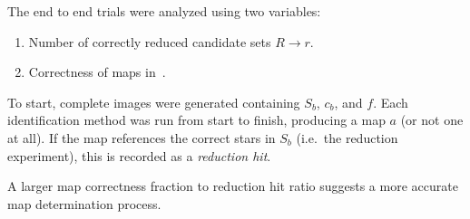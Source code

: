 The end to end trials were analyzed using two variables:
\begin{enumerate}
    \item \label{itm:correctReducedCandidates} Number of correctly reduced candidate sets $R \rightarrow r$.
    \item Correctness of maps in~.
\end{enumerate}

To start, complete images were generated containing $S_b$, $c_b$, and $f$.
Each identification method was run from start to finish, producing a map $a$ (or not one at all).
If the map references the correct stars in $S_b$ (i.e.\ the reduction experiment), this is recorded as a
\textit{reduction hit}.

A larger map correctness fraction to reduction hit ratio suggests a more accurate map determination process.